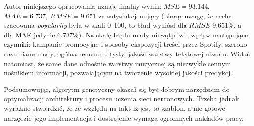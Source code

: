 \documentclass[a4paper,12pt]{article}
\numberwithin{figure}{section}
\begin{document}
    \bigskip

    Autor niniejszego opracowania uznaje finalny wynik: \textbf{$MSE = 93.144$, $MAE = 6.737$, $RMSE = 9.651$} za satysfakcjonujący (biorąc uwagę, że cecha szacowana \textit{popularity} była w skali 0--100, to błąd wyniósł dla $RMSE$ 9.651\%, a dla MAE jedynie 6.737\%). Na skalę błędu miały niewątpliwie wpływ następujące czynniki: kampanie promocyjne i sposoby ekspozycji treści przez Spotify, szeroko rozumiane mody, ogólna renoma artysty, jakość warstwy tekstowej utworu. Widać natomiast, że same dane odnośnie warstwy muzycznej są niezwykle cennym nośnikiem informacji, pozwalającym na tworzenie wysokiej jakości predykcji.

    \bigskip

    Podsumowując, algorytm genetyczny okazał się być dobrym narzędziem do optymalizacji architektury i procesu uczenia sieci neuronowych. Trzeba jednak wyraźnie stwierdzić, że ze względu na fakt iż jest to szablon, a nie gotowe narzędzie jego implementacja i dostrojenie wymaga ogromnych nakładów pracy.

    \newpage


    \printbibliography
\end{document}
